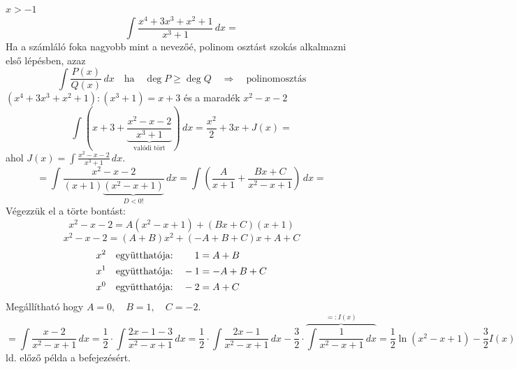 \documentclass[a4paper,11.5pt]{article}
\begin{document}
	\begin{task}$x>-1$
		\[ \int\frac{x^4+3x^3+x^2+1}{x^3+1}\,dx= \]
		Ha a számláló foka nagyobb mint a nevezőé, polinom osztást szokás alkalmazni első lépésben, azaz
		\[ \int\frac{P(x)}{Q(x)}\,dx\quad \text{ha}\quad \deg P\geq\deg Q\quad \Rightarrow\quad \text{polinomosztás} \]
		$(x^4+3x^3+x^2+1):(x^3+1)=x+3$ és a maradék $x^2-x-2$
		\[ \int\left(x+3+\underbrace{\frac{x^2-x-2}{x^3+1}}_{\text{valódi tört}}\right)\,dx=\frac{x^2}{2}+3x+J(x)= \]
		ahol $J(x)=\int\frac{x^2-x-2}{x^3+1}\,dx$.
		\[ =\int\frac{x^2-x-2}{(x+1)\underbrace{(x^2-x+1)}_{D<0!}}\,dx=\int\left(\frac{A}{x+1}+\frac{Bx+C}{x^2-x+1}\right)\,dx= \]
		Végezzük el a törte bontást:
		\[ x^2-x-2=A(x^2-x+1)+(Bx+C)(x+1) \]
		\[ x^2-x-2=(A+B)x^2+(-A+B+C)x+A+C \]
		\vspace{-7mm}
		\begin{align*}
			x^2 \quad \text{együtthatója:}&\hspace{7.8mm} 1=A+B\\
			x^1 \quad \text{együtthatója:}& \quad -1=-A+B+C\\
			x^0 \quad \text{együtthatója:}&\quad  -2=A+C
		\end{align*}
		Megállítható hogy $A=0,\quad B=1,\quad C=-2$.
		\[=\int\frac{x-2}{x^2-x+1}\,dx=\frac{1}{2}\cdot\int\frac{2x-1-3}{x^2-x+1}\,dx=\frac{1}{2}\cdot\int\frac{2x-1}{x^2-x+1}\,dx-\frac{3}{2}\cdot\overbrace{\int\frac{1}{x^2-x+1}\,dx}^{=:I(x)}= \frac{1}{2}\ln(x^2-x+1)-\frac{3}{2}I(x) \]
		ld. előző példa a befejezésért.
	\end{task}
\end{document}
